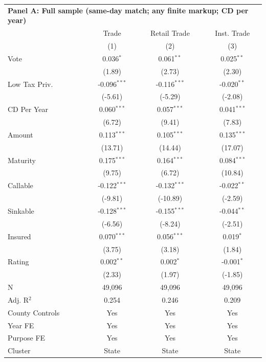 \begingroup
\centering
\begin{tabular*}{\textwidth}{@{\extracolsep{\fill}}lccc}
\multicolumn{5}{l}{\textbf{Panel A: Full sample (same-day match; any finite markup; CD per year)}}\\

\addlinespace
   \toprule
                   & Trade          & Retail Trade   & Inst. Trade\\  
                   & (1)            & (2)            & (3)\\  
   \midrule 
   Vote            & 0.036$^{*}$    & 0.061$^{**}$   & 0.025$^{**}$\\   
                   & (1.89)        & (2.73)        & (2.30)\\   
   Low Tax Priv.   & -0.096$^{***}$ & -0.116$^{***}$ & -0.020$^{**}$\\   
                   & (-5.61)       & (-5.29)       & (-2.08)\\   
   CD Per Year     & 0.060$^{***}$  & 0.057$^{***}$  & 0.041$^{***}$\\   
                   & (6.72)        & (9.41)        & (7.83)\\   
   Amount          & 0.113$^{***}$  & 0.105$^{***}$  & 0.135$^{***}$\\   
                   & (13.71)       & (14.44)       & (17.07)\\   
   Maturity        & 0.175$^{***}$  & 0.164$^{***}$  & 0.084$^{***}$\\   
                   & (9.75)        & (6.72)        & (10.84)\\   
   Callable        & -0.122$^{***}$ & -0.132$^{***}$ & -0.022$^{**}$\\   
                   & (-9.81)       & (-10.89)      & (-2.59)\\   
   Sinkable        & -0.128$^{***}$ & -0.155$^{***}$ & -0.044$^{**}$\\   
                   & (-6.56)       & (-8.24)       & (-2.51)\\   
   Insured         & 0.070$^{***}$  & 0.056$^{***}$  & 0.019$^{*}$\\   
                   & (3.75)        & (3.18)        & (1.84)\\   
   Rating          & 0.002$^{**}$   & 0.002$^{*}$    & -0.001$^{*}$\\   
                   & (2.33)        & (1.97)        & (-1.85)\\   
   \hline
   N    & 49,096         & 49,096         & 49,096\\  
   Adj. R$^2$  & 0.254          & 0.246          & 0.209\\  
   County Controls & Yes            & Yes            & Yes\\  
   Year FE         & Yes            & Yes            & Yes\\  
   Purpose FE      & Yes            & Yes            & Yes\\  
   Cluster              & State & State & State\\  
   \bottomrule
\end{tabular*}
\par\endgroup
